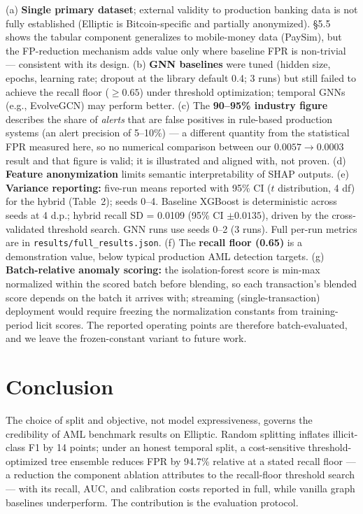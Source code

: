 \documentclass[11pt]{article}
\begin{document}
(a) \textbf{Single primary dataset}; external validity to production banking data is not fully established (Elliptic is Bitcoin-specific and partially anonymized). \S5.5 shows the tabular component generalizes to mobile-money data (PaySim), but the FP-reduction mechanism adds value only where baseline FPR is non-trivial --- consistent with its design. (b) \textbf{GNN baselines} were tuned (hidden size, epochs, learning rate; dropout at the library default 0.4; 3 runs) but still failed to achieve the recall floor ($\geq 0.65$) under threshold optimization; temporal GNNs (e.g., EvolveGCN) may perform better. (c) The \textbf{90--95\% industry figure} describes the share of \emph{alerts} that are false positives in rule-based production systems (an alert precision of 5--10\%) --- a different quantity from the statistical FPR measured here, so no numerical comparison between our $0.0057 \rightarrow 0.0003$ result and that figure is valid; it is illustrated and aligned with, not proven. (d) \textbf{Feature anonymization} limits semantic interpretability of SHAP outputs. (e) \textbf{Variance reporting:} five-run means reported with 95\% CI ($t$ distribution, 4 df) for the hybrid (Table~2); seeds 0--4. Baseline XGBoost is deterministic across seeds at 4 d.p.; hybrid recall SD = 0.0109 (95\% CI $\pm 0.0135$), driven by the cross-validated threshold search. GNN runs use seeds 0--2 (3 runs). Full per-run metrics are in \texttt{results/full\_results.json}. (f) The \textbf{recall floor (0.65)} is a demonstration value, below typical production AML detection targets. (g) \textbf{Batch-relative anomaly scoring:} the isolation-forest score is min-max normalized within the scored batch before blending, so each transaction's blended score depends on the batch it arrives with; streaming (single-transaction) deployment would require freezing the normalization constants from training-period licit scores. The reported operating points are therefore batch-evaluated, and we leave the frozen-constant variant to future work.

\section{Conclusion}

The choice of split and objective, not model expressiveness, governs the credibility of AML benchmark results on Elliptic. Random splitting inflates illicit-class F1 by 14 points; under an honest temporal split, a cost-sensitive threshold-optimized tree ensemble reduces FPR by 94.7\% relative at a stated recall floor --- a reduction the component ablation attributes to the recall-floor threshold search --- with its recall, AUC, and calibration costs reported in full, while vanilla graph baselines underperform. The contribution is the evaluation protocol.
\end{document}
